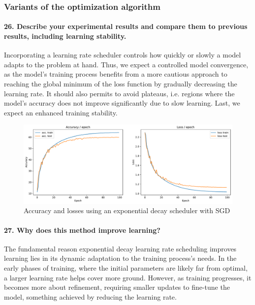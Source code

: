 \documentclass{article}
\theoremstyle{plain}%
\theoremstyle{definition}
\theoremstyle{remark}
\begin{document}
\subsubsection{Variants of the optimization algorithm}
\paragraph{26. Describe your experimental results and compare them to previous results, including learning stability.}

Incorporating a learning rate scheduler controls how quickly or slowly a model adapts to the problem at hand. Thus, we expect a controlled model convergence, as the model's training process benefits from a more cautious approach to reaching the global minimum of the loss function by gradually decreasing the learning rate. It should also permits to avoid plateaus, i.e. regions where the model's accuracy does not improve significantly due to slow learning. Last, we expect an enhanced training stability.

\begin{figure}[H]
    \centering
    \includegraphics*[width=\textwidth]{figs/CNN/optim_variants.pdf}
    \caption{Accuracy and losses using an exponential decay scheduler with SGD}
    \label{fig:optim_variants}
\end{figure}

\paragraph{27. Why does this method improve learning?}
The fundamental reason exponential decay learning rate scheduling improves learning lies in its dynamic adaptation to the training process's needs. In the early phases of training, where the initial parameters are likely far from optimal, a larger learning rate helps cover more ground. However, as training progresses, it becomes more about refinement, requiring smaller updates to fine-tune the model, something achieved by reducing the learning rate.
\end{document}
